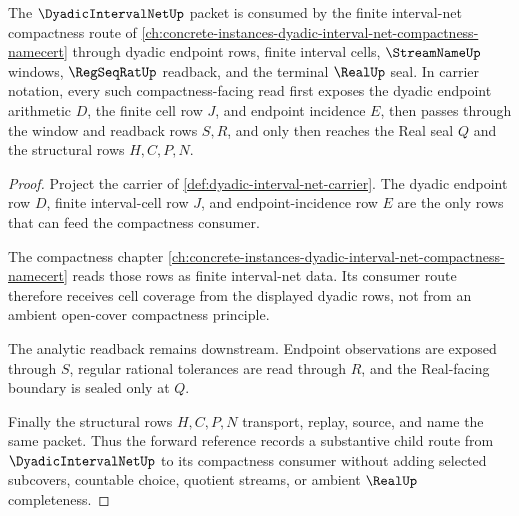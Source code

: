 \begin{theorem}
\label{thm:dyadic-interval-net-forward-reference}
The $\DyadicIntervalNetUp$ packet is consumed by the finite interval-net compactness route of \autoref{ch:concrete-instances-dyadic-interval-net-compactness-namecert} through dyadic endpoint rows, finite interval cells, $\StreamNameUp$ windows, $\RegSeqRatUp$ readback, and the terminal $\RealUp$ seal. In carrier notation, every such compactness-facing read first exposes the dyadic endpoint arithmetic $D$, the finite cell row $J$, and endpoint incidence $E$, then passes through the window and readback rows $S,R$, and only then reaches the Real seal $Q$ and the structural rows $H,C,P,N$.
\end{theorem}
\begin{proof}
Project the carrier of \autoref{def:dyadic-interval-net-carrier}. The dyadic endpoint row $D$, finite interval-cell row $J$, and endpoint-incidence row $E$ are the only rows that can feed the compactness consumer.

The compactness chapter \autoref{ch:concrete-instances-dyadic-interval-net-compactness-namecert} reads those rows as finite interval-net data. Its consumer route therefore receives cell coverage from the displayed dyadic rows, not from an ambient open-cover compactness principle.

The analytic readback remains downstream. Endpoint observations are exposed through $S$, regular rational tolerances are read through $R$, and the Real-facing boundary is sealed only at $Q$.

Finally the structural rows $H,C,P,N$ transport, replay, source, and name the same packet. Thus the forward reference records a substantive child route from $\DyadicIntervalNetUp$ to its compactness consumer without adding selected subcovers, countable choice, quotient streams, or ambient $\RealUp$ completeness.
\end{proof}
